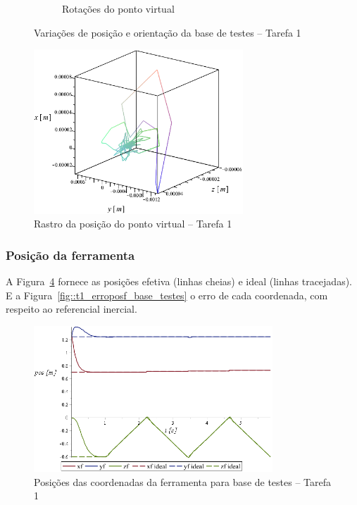 \begin{figure}[h]
\begin{subfigure}[b]{0.48\textwidth}
        \caption{Rotações do ponto virtual}
        \label{fig::t1_q456_base_testes}
    \end{subfigure}
    \caption{Variações de posição e orientação da base de testes -- Tarefa 1}
    \label{fig::t1_q123456_base_testes}
\end{figure}

\begin{figure}[h!]
	\centering 
 	\includegraphics[width=0.70\textwidth]{figs/t1_pvirtural_base_testes}
 	\caption{Rastro da posição do ponto virtual -- Tarefa 1}
 	\label{fig::t1_pvirtural_base_testes}
\end{figure}


\subsubsection{Posição da ferramenta}

A Figura~\ref{fig::t1_posf_base_testes} fornece as posições efetiva (linhas
cheias) e ideal (linhas tracejadas). E a
Figura~\ref{fig::t1_erroposf_base_testes} o erro de cada coordenada, com
respeito ao referencial inercial.

\begin{figure}[h!]
	\centering 
 	\includegraphics[width=0.80\textwidth]{figs/t1_posf_base_testes}
 	\caption{Posições das coordenadas da ferramenta para base de testes -- Tarefa
 	1}
 	\label{fig::t1_posf_base_testes}
\end{figure}

